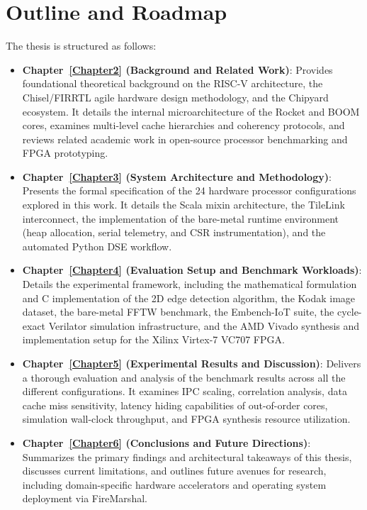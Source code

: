 \section{Outline and Roadmap}
\label{sec:outline_and_roadmap}

The thesis is structured as follows:

\begin{itemize}
    \item \textbf{Chapter~\ref{Chapter2} (Background and Related Work)}: Provides foundational theoretical background on the RISC-V architecture, 
      the Chisel/FIRRTL agile hardware design methodology, and the Chipyard ecosystem. 
      It details the internal microarchitecture of the Rocket and BOOM cores, examines multi-level cache hierarchies and coherency protocols, 
      and reviews related academic work in open-source processor benchmarking and FPGA prototyping.
    \item \textbf{Chapter~\ref{Chapter3} (System Architecture and Methodology)}: Presents the formal specification of the 24 hardware processor configurations explored in this work.
      It details the Scala mixin architecture, the TileLink interconnect, the implementation of the bare-metal runtime environment (heap allocation, serial telemetry, and CSR instrumentation), 
      and the automated Python DSE workflow.
    \item \textbf{Chapter~\ref{Chapter4} (Evaluation Setup and Benchmark Workloads)}: Details the experimental framework, 
      including the mathematical formulation and C implementation of the 2D edge detection algorithm, the Kodak image dataset, 
      the bare-metal FFTW benchmark, the Embench-IoT suite, the cycle-exact Verilator simulation infrastructure, and the AMD Vivado synthesis and implementation setup for the Xilinx Virtex-7 VC707 FPGA.
    \item \textbf{Chapter~\ref{Chapter5} (Experimental Results and Discussion)}: Delivers a thorough evaluation and analysis of the benchmark results across all the different configurations. 
      It examines IPC scaling, correlation analysis, data cache miss sensitivity, latency hiding capabilities of out-of-order cores, simulation wall-clock throughput, 
      and FPGA synthesis resource utilization.
    \item \textbf{Chapter~\ref{Chapter6} (Conclusions and Future Directions)}: Summarizes the primary findings and architectural takeaways of this thesis, 
      discusses current limitations, and outlines future avenues for research, including domain-specific hardware accelerators and operating system deployment via FireMarshal.
\end{itemize}




